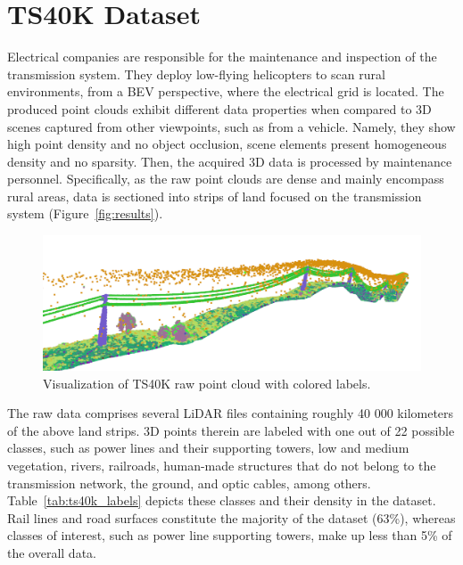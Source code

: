 \documentclass[final,supplement,onefignum,onetabnum]{siamonline171218}
\begin{document}
\maketitle

\section{TS40K Dataset\label{sec:ts40k}}

Electrical companies are responsible for the maintenance and inspection of the transmission system. They deploy low-flying helicopters to scan rural environments, from a BEV perspective, where the electrical grid is located.
%
The produced point clouds exhibit different data properties when compared to 3D scenes captured from other viewpoints, such as from a vehicle.
Namely, they show high point density and no object occlusion, scene elements present homogeneous density and no sparsity.
%
Then, the acquired 3D data is processed by maintenance personnel. Specifically, as the raw point clouds are dense and mainly encompass rural areas, data is sectioned into strips of land focused on the transmission system (Figure~\ref{fig:results}). 
%
\begin{figure}
    \centering
    \includegraphics[width=1\linewidth]{data5-5.png}
    \caption{Visualization of TS40K raw point cloud with colored labels.}
    \label{fig:ts40k}
\end{figure}
The raw data comprises several LiDAR files containing roughly 40 000 kilometers of the above land strips. 3D points therein are labeled with one out of 22 possible classes, such as power lines and their supporting towers, low and medium vegetation, rivers, railroads, human-made structures that do not belong to the transmission network, the ground, and optic cables, among others.
%
Table~\ref{tab:ts40k_labels} depicts these classes and their density in the dataset. Rail lines and road surfaces constitute the majority of the dataset (63\%), whereas classes of interest, such as power line supporting towers, make up less than 5\% of the overall data. 
\end{document}
